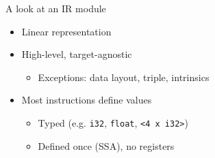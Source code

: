 
\begin{frame}[fragile]{A look at an IR module}

\begin{itemize}
    \item Linear representation
    \item High-level, target-agnostic
    \begin{itemize}
        \item Exceptions: data layout, triple, intrinsics
    \end{itemize}
    \item Most instructions define values
    \begin{itemize}
        \item Typed (e.g. \texttt{i32}, \texttt{float}, \texttt{<4 x i32>})
        \item Defined once (SSA), no registers
    \end{itemize}
\end{itemize}



\end{frame}


